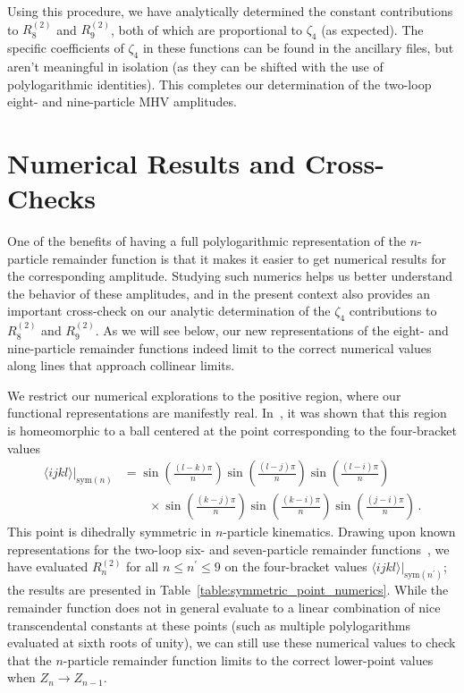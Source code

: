 \documentclass[11pt]{article}
\begin{document}
Using this procedure, we have analytically determined the constant contributions to $R_8^{(2)}$\! and $R_9^{(2)}$\!, both of which are proportional to $\zeta_4$ (as expected). The specific coefficients of $\zeta_4$ in these functions can be found in the ancillary files, but aren't meaningful in isolation (as they can be shifted with the use of polylogarithmic identities). This completes our determination of the two-loop eight- and nine-particle MHV amplitudes.


\section{Numerical Results and Cross-Checks}
\label{sec:numerics}

One of the benefits of having a full polylogarithmic representation of the $n$-particle remainder function is that it makes it easier to get numerical results for the corresponding amplitude. Studying such numerics helps us better understand the behavior of these amplitudes, and in the present context also provides an important cross-check on our analytic determination of the $\zeta_4$ contributions to $R_8^{(2)}$\! and $R_9^{(2)}$\!. As we will see below, our new representations of the eight- and nine-particle remainder functions indeed limit to the correct numerical values along lines that approach collinear limits.

We restrict our numerical explorations to the positive region, where our functional representations are manifestly real. In~\cite{Galashin:2017onl}, it was shown that this region is homeomorphic to a ball centered at the point corresponding to the four-bracket values
\begin{align}
\langle i j k l \rangle \big|_{\text{sym}(n)} &= \sin\left(\frac{(l - k) \pi}{n} \right) \sin\left(\frac{(l - j) \pi}{n} \right) \sin\left(\frac{(l - i) \pi}{n}\right) \nonumber \\
&\qquad \times \sin\left(\frac{(k - j) \pi}{n}\right) \sin\left(\frac{(k - i) \pi}{n}\right) \sin\left(\frac{(j - i) \pi}{n}\right) \, . \label{eq:symmetric_point}
\end{align}
This point is dihedrally symmetric in $n$-particle kinematics. Drawing upon known representations for the two-loop six- and seven-particle remainder functions~\cite{DelDuca:2009au,DelDuca:2010zg,Goncharov:2010jf,Golden:2014xqf}, we have evaluated $R_n^{(2)}$ for all $n \leq n^\prime \leq 9$ on the four-bracket values $\langle i j k l \rangle \big|_{\text{sym}(n^\prime)}$; the results are presented in Table~\ref{table:symmetric_point_numerics}. While the  remainder function does not in general evaluate to a linear combination of nice transcendental constants at these points (such as multiple polylogarithms evaluated at sixth roots of unity), we can still use these numerical values to check that the $n$-particle remainder function limits to the correct lower-point values when $Z_n \to Z_{n-1}$. 
\end{document}
